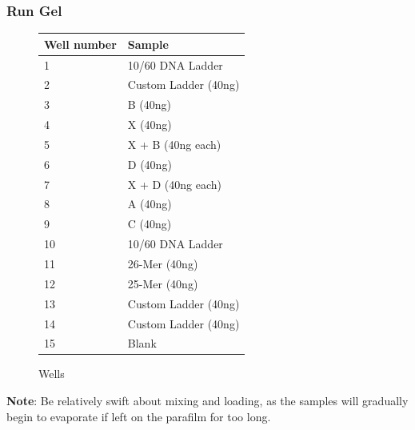 \documentclass[letterpaper]{article}
\begin{document}
\begin{enumerate}
\subsubsection{Run Gel}
\begin{figure}[ht] %
\begin{center} 
\begin{tabular}{|l|l|}
\hline
Well number    & Sample \\ \hline
1                                  & 10/60 DNA Ladder   \\ \hline
2								   & Custom Ladder (40ng) \\ \hline
3                                  & B (40ng)\\ \hline
4                                  & X (40ng) \\ \hline
5                                  & X + B  (40ng each)\\ \hline
6								   & D (40ng)	\\ \hline
7                                  & X + D (40ng each)	\\ \hline
8                                  & A (40ng)	\\ \hline
9                                  & C (40ng)  \\ \hline
10                                 & 10/60 DNA Ladder  \\ \hline
11                                 & 26-Mer (40ng) \\ \hline
12                                 & 25-Mer (40ng) \\ \hline %
13                                 & Custom Ladder (40ng)     \\ \hline
14                                 & Custom Ladder (40ng)      \\ \hline
15                                 & Blank  \\ \hline

\end{tabular}
\label{tab:Gel Layout} %
\caption{Wells} %
\end{center}
\end{figure}
\textbf{Note}: Be relatively swift about mixing and loading, as the samples will gradually begin to evaporate if left on the parafilm for too long.


\end{enumerate}
\end{document}
